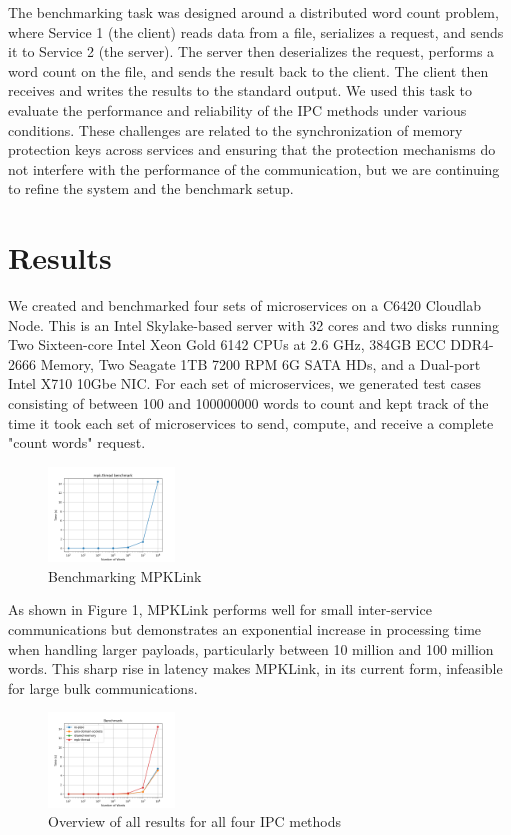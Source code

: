 \documentclass[letterpaper,twocolumn,10pt]{article}
\begin{document}
The benchmarking task was designed around a distributed word count problem, where Service 1 (the client) reads data from a file, serializes a request, and sends it to Service 2 (the server).
The server then deserializes the request, performs a word count on the file, and sends the result back to the client.
The client then receives and writes the results to the standard output.
We used this task to evaluate the performance and reliability of the IPC methods under various conditions.
These challenges are related to the synchronization of memory protection keys across services and ensuring that the protection mechanisms do not interfere with the performance of the communication, but we are continuing to refine the system and the benchmark setup.

\section{Results}
We created and benchmarked four sets of microservices on a C6420 Cloudlab Node. This is an Intel Skylake-based server with 32 cores and two disks running Two Sixteen-core Intel Xeon Gold 6142 CPUs at 2.6 GHz, 384GB ECC DDR4-2666 Memory, Two Seagate 1TB 7200 RPM 6G SATA HDs, and a Dual-port Intel X710 10Gbe NIC.  
For each set of microservices, we generated test cases consisting of between 100 and 100000000 words to count and kept track of the time it took each set of microservices to send, compute, and receive a complete "count words" request.
\begin{figure}[h]
    \centering
    \includegraphics[width=0.3\textwidth]{../benchmark/2024-12-08_17-19-30/mpk-thread.png}
    \caption{Benchmarking MPKLink}
\end{figure}

As shown in Figure 1, MPKLink performs well for small inter-service communications but demonstrates an exponential increase in processing time when handling larger payloads, particularly between 10 million and 100 million words. This sharp rise in latency makes MPKLink, in its current form, infeasible for large bulk communications.

\begin{figure}[h]
    \centering
    \includegraphics[width=0.3\textwidth]{../benchmark/2024-12-08_17-19-30/overview.png}
    \caption{Overview of all results for all four IPC methods}
\end{figure}
\end{document}

